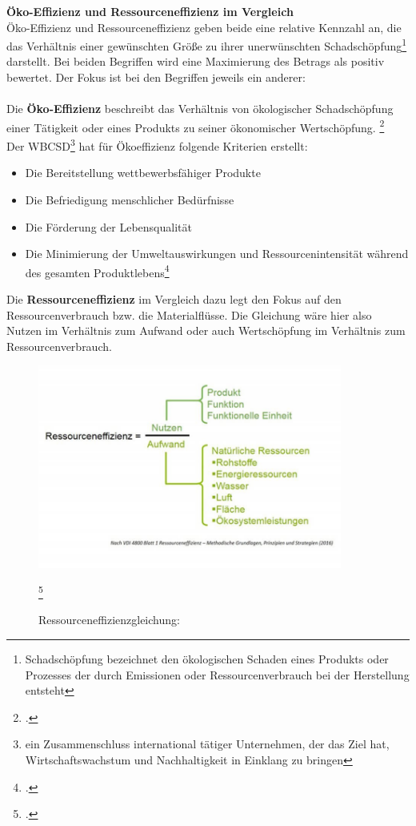 \documentclass{scrartcl}
\begin{document}
\textbf{Öko-Effizienz und Ressourceneffizienz im Vergleich}\\
Öko-Effizienz und Ressourceneffizienz geben beide eine relative Kennzahl an, die das Verhältnis einer gewünschten Größe zu ihrer unerwünschten Schadschöpfung\footnote{Schadschöpfung bezeichnet den ökologischen Schaden eines Produkts oder Prozesses der durch Emissionen oder Ressourcenverbrauch bei der Herstellung entsteht} darstellt. Bei beiden Begriffen wird eine  Maximierung des Betrags als positiv bewertet. Der Fokus ist bei den Begriffen jeweils ein anderer: 
\\
\\
Die \textbf{Öko-Effizienz} beschreibt das Verhältnis von ökologischer Schadschöpfung einer Tätigkeit oder eines Produkts zu seiner ökonomischer Wertschöpfung. \footcite[Vgl.][S.]{Schaltegger1990OkologischeUnternehmung} 
\\
 Der WBCSD\footnote{ein Zusammenschluss international tätiger Unternehmen, der das Ziel hat, Wirtschaftswachstum und Nachhaltigkeit in Einklang zu bringen} hat für Ökoeffizienz folgende Kriterien erstellt: 
 \begin{itemize}
 \item Die Bereitstellung wettbewerbsfähiger Produkte
 \item Die Befriedigung menschlicher Bedürfnisse 
 \item Die Förderung der Lebensqualität
 \item Die Minimierung der Umweltauswirkungen und Ressourcenintensität während des gesamten Produktlebens\footcite{OkoeffizienzBrockhaus.de}
 \end{itemize}
Die \textbf{Ressourceneffizienz} im Vergleich dazu legt den Fokus auf den Ressourcenverbrauch bzw. die Materialflüsse. Die Gleichung wäre hier also Nutzen im Verhältnis zum Aufwand oder auch Wertschöpfung im Verhältnis zum Ressourcenverbrauch.
\begin{figure}[htbp]
\centering
\includegraphics[width=10cm]{image_folder/ressourceneffizienz.jpg}
\caption{Ressourceneffizienzgleichung:}
\label{fig:Ressourceneffizienzgleichung}\footcite{Essel2010AnalyseFazit}
\end{figure}
\end{document}
